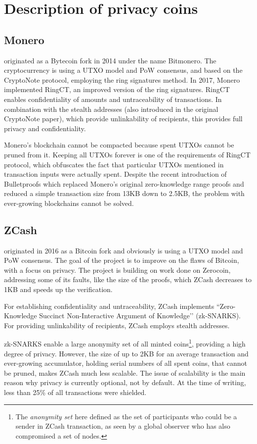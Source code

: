 \documentclass[8pt,fleqn,openany]{book}
\begin{document}
{		\section{Description of privacy coins}
		
		\subsection{Monero} originated as a Bytecoin fork in 2014 under the name Bitmonero. The cryptocurrency is using a UTXO model and PoW consensus, and based on the CryptoNote protocol\cite{c2}, employing the ring signatures method. In 2017, Monero implemented RingCT\cite{c3}, an improved version of the ring signatures. RingCT enables confidentiality of amounts and untraceability of transactions. In combination with the stealth addresses (also introduced in the original CryptoNote paper), which provide unlinkability of recipients, this provides full privacy and confidentiality.
		
		Monero’s blockchain cannot be compacted because spent UTXOs cannot be pruned from it. Keeping all UTXOs forever is one of the requirements of RingCT protocol, which obfuscates the fact that particular UTXOs mentioned in transaction inputs were actually spent. 
		Despite the recent introduction of Bulletproofs\cite{c4} which replaced Monero’s original zero-knowledge range proofs and reduced a simple transaction size from 13KB down to 2.5KB, the problem with ever-growing blockchains cannot be solved. 
		
		\subsection{ZCash} originated in 2016 as a Bitcoin fork and obviously is using a UTXO model and PoW consensus. The goal of the project is to improve on the flaws of Bitcoin, with a focus on privacy. The project is building on work done on Zerocoin\cite{c5}, addressing some of its faults, like the size of the proofs, which ZCash decreases to 1KB and speeds up the verification.
		
		For establishing confidentiality and untraceability, ZCash implements ``Zero-Knowledge Succinct Non-Interactive Argument of Knowledge’’ (zk-SNARKS)\cite{c6}. For providing unlinkability of recipients, ZCash employs stealth addresses.
		
		zk-SNARKS enable a large anonymity set of all minted coins\footnote{The \textit{anonymity set} here defined as the set of participants who could be a sender in ZCash transaction, as seen by a global observer who has also compromised a set of nodes.}, providing a high degree of privacy. However, the size of up to 2KB for an average transaction and ever-growing accumulator, holding serial numbers of all spent coins, that cannot be pruned, makes ZCash much less scalable. The issue of scalability is the main reason why privacy is currently optional, not by default. At the time of writing, less than 25\% of all transactions were shielded.
		
}
\end{document}
